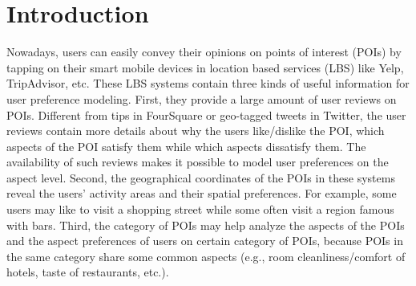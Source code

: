 \section{Introduction}
\label{sec:intro}
Nowadays, users can easily convey their
opinions on points of interest (POIs)
by tapping on their smart mobile devices in location based
services (LBS) like Yelp, TripAdvisor, etc.
These LBS systems contain three kinds of useful information
for user preference modeling.
First, they provide a large amount of user
reviews on POIs. Different from tips
in FourSquare or geo-tagged tweets in Twitter,
the user reviews contain more details about
why the users like/dislike the POI, which aspects of the POI
satisfy them while which aspects dissatisfy them.
The availability of such reviews makes it
possible to model user preferences on the aspect level.
Second, the geographical coordinates of the POIs in these
systems reveal the users' activity areas and their spatial
preferences. For example, some users may like to visit
a shopping street while some often visit a region famous
with bars. Third, the category of POIs may help analyze the
aspects of the POIs and the aspect preferences of users
on certain category of POIs, because POIs in the same category
share some common aspects (e.g., room cleanliness/comfort
of hotels, taste of restaurants, etc.).

